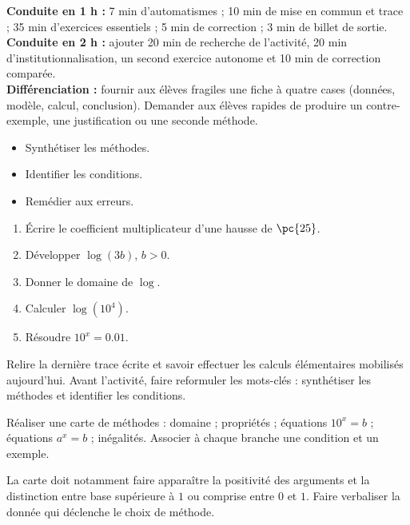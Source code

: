 \ifmxteacher
\begin{method}
\textbf{Conduite en 1 h :} 7 min d'automatismes ; 10 min de mise en commun et trace ; 35 min d'exercices essentiels ; 5 min de correction ; 3 min de billet de sortie.\\
\textbf{Conduite en 2 h :} ajouter 20 min de recherche de l'activité, 20 min d'institutionnalisation, un second exercice autonome et 10 min de correction comparée.\\
\textbf{Différenciation :} fournir aux élèves fragiles une fiche à quatre cases (données, modèle, calcul, conclusion). Demander aux élèves rapides de produire un contre-exemple, une justification ou une seconde méthode.
\end{method}
\fi
{}
\begin{objectives}\begin{itemize}\item Synthétiser les méthodes.\item Identifier les conditions.\item Remédier aux erreurs.\end{itemize}\end{objectives}
\begin{fluency}\begin{enumerate}\item Écrire le coefficient multiplicateur d'une hausse de $\pc{25}$. \item Développer $\log(3b)$, $b>0$. \item Donner le domaine de $\log$. \mxblank{$]0,+\infty[$}\item Calculer $\log(10^4)$. \item Résoudre $10^x=\num{0,01}$. \end{enumerate}\end{fluency}
\begin{prerequisites}Relire la dernière trace écrite et savoir effectuer les calculs élémentaires mobilisés aujourd'hui. Avant l'activité, faire reformuler les mots-clés : synthétiser les méthodes et identifier les conditions.\end{prerequisites}

\begin{activity}
Réaliser une carte de méthodes : domaine ; propriétés ; équations $10^x=b$ ; équations $a^x=b$ ; inégalités. Associer à chaque branche une condition et un exemple.

\end{activity}
\begin{solution}La carte doit notamment faire apparaître la positivité des arguments et la distinction entre base supérieure à $1$ ou comprise entre $0$ et $1$. Faire verbaliser la donnée qui déclenche le choix de méthode.\end{solution}

